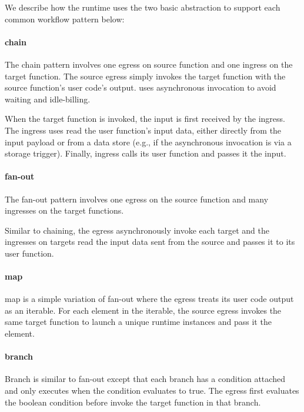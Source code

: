 We describe how the \name{} runtime uses the two basic abstraction to support
each common workflow pattern below:

\paragraph{chain} 

The chain pattern involves one egress on source function and one ingress on
the target function. The source egress simply invokes the target function with
the source function's user code's output. \name{} uses asynchronous invocation
to avoid waiting and idle-billing.

When the target function is invoked, the input is first received by the
\name{} ingress. The ingress uses read the user function's input data, either
directly from the input payload or from a data store (e.g., if the
asynchronous invocation is via a storage trigger). Finally, ingress calls its
user function and passes it the input.

\paragraph{fan-out}

The fan-out pattern involves one egress on the source function and many
ingresses on the target functions.

Similar to chaining, the egress asynchronously invoke each target and the
ingresses on targets read the input data sent from the source and passes it to
its user function.

\paragraph{map}

map is a simple variation of fan-out where the egress treats its user code
output as an iterable. For each element in the iterable, the source egress
invokes the same target function to launch a unique runtime instances and pass
it the element.

\paragraph{branch}

Branch is similar to fan-out except that each branch has a condition attached
and only executes when the condition evaluates to true. The egress first
evaluates the boolean condition before invoke the target function in that
branch.

